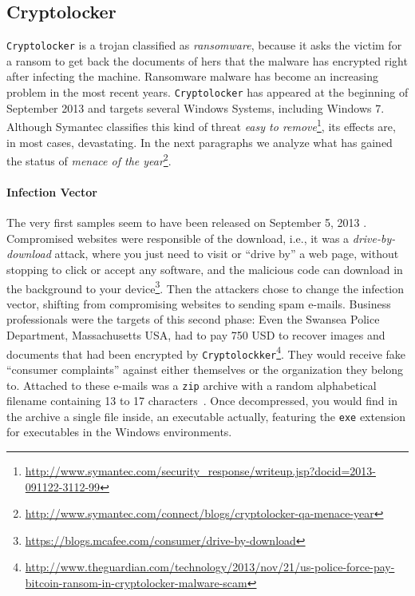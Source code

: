 \subsection{Cryptolocker} %
\label{sub:cryptolocker}
\texttt{Cryptolocker} is a trojan classified as \emph{ransomware}, because it asks
the victim for a ransom to get back the documents of hers that the malware has encrypted right after infecting the machine. Ransomware malware has become an increasing problem \cite{mcafee2013} in the most
recent years. \texttt{Cryptolocker} has appeared at the beginning of September 2013
and
targets several Windows Systems, including Windows 7. Although Symantec
classifies this kind of threat \emph{easy to remove}\footnote{\url{http://www.symantec.com/security_response/writeup.jsp?docid=2013-091122-3112-99}}, its effects are, in most cases,
devastating.
In the next paragraphs we analyze what has gained the status of \emph{menace of the year}\footnote{\url{http://www.symantec.com/connect/blogs/cryptolocker-qa-menace-year}}.

\paragraph{Infection Vector}
The very first samples seem to have been released on
September 5, 2013 \cite{dell2013}. Compromised websites were responsible
of the download, i.e., it was a \emph{drive-by-download} attack, where you just need to visit or ``drive by'' a web page, without stopping to click or accept any software, and the malicious code can download in the background to your device\footnote{\url{https://blogs.mcafee.com/consumer/drive-by-download}}.
Then the attackers chose to change the infection vector, shifting from
compromising websites to sending spam e-mails. Business professionals were the targets
of this second phase: Even the Swansea Police Department, Massachusetts USA, had to pay 750 USD to recover images and documents that had been encrypted by
\texttt{Cryptolockker}\footnote{\url{http://www.theguardian.com/technology/2013/nov/21/us-police-force-pay-bitcoin-ransom-in-cryptolocker-malware-scam}}. They would receive fake ``consumer complaints'' against
either themselves or the organization they belong to. Attached to these e-mails
was a \texttt{zip} archive with a random alphabetical filename containing 13
to 17 characters~\cite{dell2013}. Once decompressed, you would find in the archive
a single file inside, an executable actually, featuring the \texttt{exe}
extension for executables in the Windows environments.

